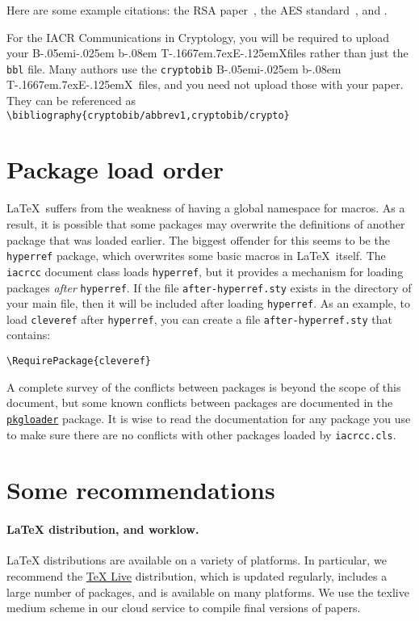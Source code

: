 \documentclass{iacrcc}
\def\BibTeX{{\rm B\kern-.05em{\sc i\kern-.025em b}\kern-.08em
    T\kern-.1667em\lower.7ex\hbox{E}\kern-.125emX}}
\begin{document}
Here are some example citations: the RSA paper~\cite{RSA78}, the AES
standard~\cite{AES-FIPS}, and \cite{DBLP:conf/crypto/Kocher96}.

For the IACR Communications in Cryptology, you will be required to
upload your \BibTeX files rather than just the \texttt{bbl} file.
Many authors use the \texttt{cryptobib} \BibTeX\ files, and you need
not upload those with your paper. They can be referenced as
\texttt{\textbackslash bibliography\{cryptobib/abbrev1,cryptobib/crypto\}}

\section{Package load order}\label{sec:loadorder}

\LaTeX\ suffers from the weakness of having a global namespace for
macros. As a result, it is possible that some packages may overwrite
the definitions of another package that was loaded earlier. The
biggest offender for this seems to be the \texttt{hyperref} package,
which overwrites some basic macros in \LaTeX\ itself. The
\texttt{iacrcc} document class loads \texttt{hyperref}, but it
provides a mechanism for loading packages \emph{after} \texttt{hyperref}. If
the file \texttt{after-hyperref.sty} exists in the directory of your
main file, then it will be included after loading \texttt{hyperref}.
As an example, to load \texttt{cleveref} after \texttt{hyperref}, you
can create a file \texttt{after-hyperref.sty} that contains:
\begin{verbatim}
\RequirePackage{cleveref}
\end{verbatim}
A complete survey of the conflicts between packages is beyond the scope of this document, but
some known conflicts between packages are documented in the
\href{https://github.com/mhelvens/latex-pkgloader/blob/master/pkgloader-recommended.sty}{\texttt{pkgloader}}
package. It is wise to read the documentation for any package you use to make sure
there are no conflicts with other packages loaded by \texttt{iacrcc.cls}.

\section{Some recommendations}\label{sec:options}

\paragraph{\LaTeX{} distribution, and worklow.}  \LaTeX{}
distributions are available on a variety of platforms.  In particular,
we recommend the \href{https://www.tug.org/texlive/}{TeX Live}
distribution, which is updated regularly, includes a large number of
packages, and is available on many platforms. We use the texlive medium
scheme in our cloud service to compile final versions of papers.
\end{document}

